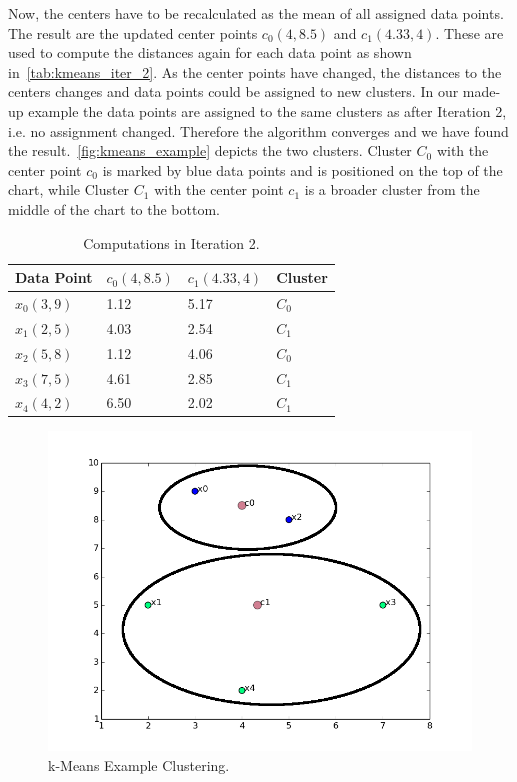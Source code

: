 Now, the centers have to be recalculated as the mean of all assigned data points. The result are the updated center points $c_0(4,8.5)$ and $c_1(4.33,4)$. These are used to compute the distances again for each data point as shown in~\autoref{tab:kmeans_iter_2}. As the center points have changed, the distances to the centers changes and data points could be assigned to new clusters. In our made-up example the data points are assigned to the same clusters as after Iteration 2, i.e. no assignment changed. Therefore the algorithm converges and we have found the result.~\autoref{fig:kmeans_example} depicts the two clusters. Cluster $C_0$ with the center point $c_0$ is marked by blue data points and is positioned on the top of the chart, while Cluster $C_1$ with the center point $c_1$ is a broader cluster from the middle of the chart to the bottom.

\begin{table}[htsb]
  \caption[Computations in Iteration 2]{Computations in Iteration 2.}\label{tab:kmeans_iter_2}
  \centering
  \begin{tabular}{l l l l}
    \toprule
      Data Point & $c_0(4,8.5)$ & $c_1(4.33,4)$ & Cluster \\
    \midrule
        $x_0(3,9)$ & 1.12 & 5.17 & $C_0$ \\
        $x_1(2,5)$ & 4.03 & 2.54 & $C_1$ \\
        $x_2(5,8)$ & 1.12 & 4.06 & $C_0$ \\
        $x_3(7,5)$ & 4.61 & 2.85 & $C_1$ \\
        $x_4(4,2)$ & 6.50 & 2.02 & $C_1$ \\
    \bottomrule
  \end{tabular}
\end{table}


\begin{figure}[htsb]
  \centering
  \includegraphics[scale=0.5, trim="0cm 1cm 0cm 0cm"]{figures/kmeans_example2}
  \caption[k-Means Example Clustering]{k-Means Example Clustering.}\label{fig:kmeans_example}
\end{figure}


